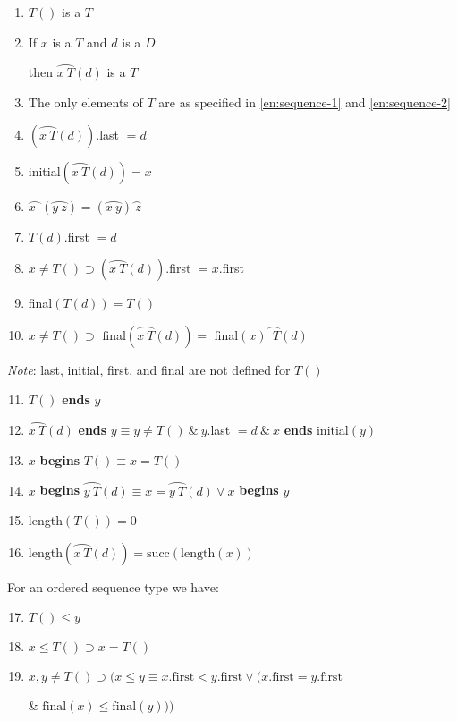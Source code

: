 \begin{enumerate}[leftmargin=2\parindent, label=(\arabic*)]
	\item \label{en:sequence-1}
	$T()$ is a $T$
	
	\item \label{en:sequence-2}
	If $x$ is a $T$ and $d$ is a $D$
	
	\quad then $\wideparen{x\ T}(d)$ is a $T$

	\item The only elements of $T$ are as specified in \ref{en:sequence-1} and \ref{en:sequence-2}

	\item $(\wideparen{x\ T}(d))$.last $= d$

	\item initial$(\wideparen{x\ T}(d)) = x$
	\item $\wideparen{x\ \ }(\wideparen{y\ z}) = (\wideparen{x\ y})\wideparen{\ z}$
	\item $T(d)$.first $= d$
	\item $x \neq T() \supset (\wideparen{x\ T}(d))$.first $= x$.first
	\item final$(T(d)) = T()$
	\item $x \neq T() \supset$ final$(\wideparen{x\ T}(d)) =$ final$(x)\wideparen{\ \ T}(d)$
\end{enumerate}

\noindent
\textit{Note}: last, initial, first, and final are not defined for $T()$

\begin{enumerate}[leftmargin=2\parindent, label=(\arabic*)]
	\setcounter{enumi}{10}
	\item $T()$ \textbf{ends} $y$
	\item $\wideparen{x\  T}(d)$ \textbf{ends} $y \equiv y \neq T()\ \&\ y$.last $= d\ \&\ x$ \textbf{ends} initial$(y)$
	\item $x$ \textbf{begins} $T() \equiv x = T()$
	\item $x$ \textbf{begins} $\wideparen{y\ T}(d) \equiv x = \wideparen{y\ T}(d) \lor x$ \textbf{begins} $y$
	\item length$(T()) = 0$
	\item length$(\wideparen{x\ T}(d)) = \text{succ}(\text{length}(x))$
\end{enumerate}

\noindent
For an ordered sequence type we have:

\begin{enumerate}[leftmargin=2\parindent, label=(\arabic*)]
	\setcounter{enumi}{16}
	\item $T() \leqslant y$
	\item $x \leqslant T() \supset x = T()$
	\item $x, y \neq T() \supset (x \leqslant y \equiv x.\text{first} < y.\text{first} \lor (x.\text{first} = y.\text{first}$
	
	\tabto*{8.9em}\& $\text{final}(x) \leqslant \text{final}(y)))$
\end{enumerate}

